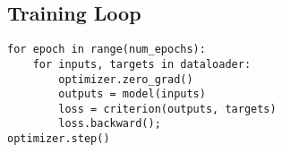 \subsection*{Training Loop}
{\color{blue}\verb|for epoch in range(num_epochs):|\\
\verb|    for inputs, targets in dataloader:|\\
\verb|        optimizer.zero_grad()|\\
\verb|        outputs = model(inputs)|\\
\verb|        loss = criterion(outputs, targets)|\\
\verb|        loss.backward(); |\\
\verb|optimizer.step()|}

\newcolumn